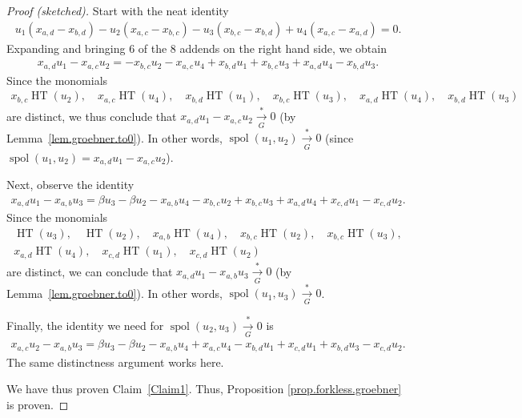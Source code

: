 \documentclass[pdftex]{sigma}
\numberwithin{equation}{section}
\begin{document}
\begin{proof}[Proof (sketched)]
Start with the neat identity
\begin{gather*}
u_{1} ( x_{a,d}-x_{b,d} ) -u_{2} ( x_{a,c}-x_{b,c} ) -u_{3} ( x_{b,c}-x_{b,d} ) +u_{4} ( x_{a,c}-x_{a,d} )=0.
\end{gather*}
Expanding and bringing $6$ of the $8$ addends on the right hand side, we obtain
\begin{gather*}
x_{a,d}u_{1}-x_{a,c}u_{2}=-x_{b,c}u_{2}-x_{a,c}u_{4}+x_{b,d}u_{1}+x_{b,c}u_{3}+x_{a,d}u_{4}-x_{b,d}u_{3}.
\end{gather*}
Since the monomials
\begin{gather*}
x_{b,c}\operatorname*{HT} ( u_{2} ) ,\quad x_{a,c}\operatorname*{HT} ( u_{4}) ,\quad x_{b,d}\operatorname*{HT}( u_{1}), \quad x_{b,c}\operatorname*{HT}( u_{3}) ,\quad x_{a,d}\operatorname*{HT}( u_{4}) ,\quad x_{b,d}\operatorname*{HT}( u_{3})
\end{gather*}
are distinct, we thus conclude that $x_{a,d}u_{1}-x_{a,c}u_{2}\overset{\ast }{\underset{G}{\longrightarrow}}0$ (by Lemma~\ref{lem.groebner.to0}). In other words, $\operatorname*{spol}( u_{1},u_{2}) \overset{\ast}{\underset{G}{\longrightarrow}}0$ (since $\operatorname*{spol}(
u_{1},u_{2}) =x_{a,d}u_{1}-x_{a,c}u_{2}$).

Next, observe the identity
\begin{gather*}
x_{a,d}u_{1}-x_{a,b}u_{3}=\beta u_{3}-\beta u_{2}-x_{a,b}u_{4}-x_{b,c} u_{2}+x_{b,c}u_{3}+x_{a,d}u_{4}+x_{c,d}u_{1}-x_{c,d}u_{2}.
\end{gather*}
Since the monomials
\begin{gather*}
 \operatorname*{HT}( u_{3}),\quad \operatorname*{HT}(u_{2}), \quad x_{a,b}\operatorname*{HT}( u_{4}), \quad x_{b,c}\operatorname*{HT}( u_{2}), \quad x_{b,c}\operatorname*{HT}(u_{3}) ,\\
 x_{a,d}\operatorname*{HT}( u_{4}) , \quad x_{c,d}\operatorname*{HT}( u_{1}) ,\quad x_{c,d}\operatorname*{HT}( u_{2})
\end{gather*}
are distinct, we can conclude that $x_{a,d}u_{1}-x_{a,b}u_{3}\overset{\ast}{\underset{G}{\longrightarrow}}0$ (by Lemma~\ref{lem.groebner.to0}). In other words, $\operatorname*{spol}( u_{1},u_{3}) \overset{\ast}{\underset{G}{\longrightarrow}}0$.

Finally, the identity we need for $\operatorname*{spol}( u_{2},u_{3}) \overset{\ast}{\underset{G}{\longrightarrow}}0$ is
\begin{gather*}
x_{a,c}u_{2}-x_{a,b}u_{3}=\beta u_{3}-\beta u_{2}-x_{a,b}u_{4}+x_{a,c}u_{4}-x_{b,d}u_{1}+x_{c,d}u_{1}+x_{b,d}u_{3}-x_{c,d}u_{2}.
\end{gather*}
The same distinctness argument works here.

We have thus proven Claim~\ref{Claim1}. Thus, Proposition \ref{prop.forkless.groebner} is proven.
\end{proof}
\end{document}
